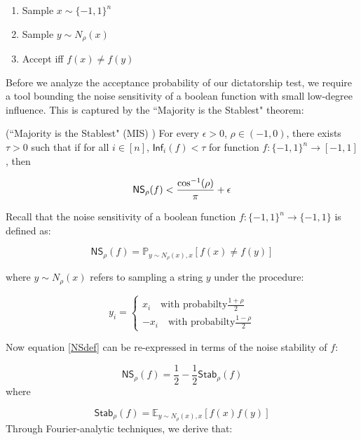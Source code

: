 \begin{enumerate}
  \item Sample $x \sim \{-1,1\}^n$
  \item Sample $y \sim N_{\rho}(x)$
  \item Accept iff $f(x) \neq f(y)$
\end{enumerate}
%
Before we analyze the acceptance probability of our dictatorship test, we require a tool bounding the noise sensitivity of a boolean function with small low-degree influence. This is captured by the ``Majority is the Stablest" theorem:

\begin{theorem} (``Majority is the Stablest" (MIS) \cite{mossel2005noise})
For every $\epsilon > 0$, $\rho \in (-1,0)$, there exists $\tau > 0$ such that if for all $i \in [n]$, $\mathsf{Inf}_i(f) < \tau$ for function $f:\{-1,1\}^n \rightarrow [-1,1]$, then

\begin{equation}
  \mathsf{NS}_{\rho}(f) < \frac{\cos^{-1}(\rho)}{\pi} + \epsilon
\end{equation}
\end{theorem}

Recall that the noise sensitivity of a boolean function $f:\{-1,1\}^n \rightarrow \{-1,1\}$ is defined as:

\begin{equation} \label{NSdef}
  \mathsf{NS}_\rho(f)  = \mathbb{P}_{y \sim N_{\rho}(x), x} [f(x) \neq f(y)]
\end{equation}

where $y \sim N_\rho(x)$ refers to sampling a string $y$ under the procedure:

\begin{equation*}
  y_i = \begin{cases}
        x_i \quad \text{with probabilty} \frac{1 + \rho}{2} \\
        -x_i \quad \text{with probabilty} \frac{1 - \rho}{2}
        \end{cases}
\end{equation*}
\newline

Now equation \ref{NSdef} can be re-expressed in terms of the noise stability of $f$:

\begin{equation}
  \mathsf{NS}_\rho(f) = \frac{1}{2} - \frac{1}{2}\mathsf{Stab}_\rho(f)
\end{equation}
where

\begin{equation*}
  \mathsf{Stab}_\rho(f) = \mathbb{E}_{y \sim N_{\rho}(x), x}[f(x)f(y)]
\end{equation*}
Through Fourier-analytic techniques, we derive that:

